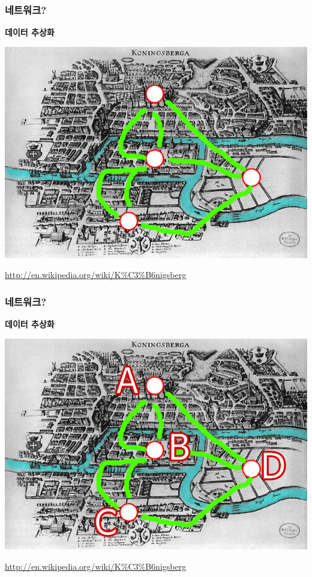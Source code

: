\documentclass{beamer}
\begin{document}
\begin{frame}
\frametitle{네트워크?}
\textbf{데이터 추상화}\\
\begin{center}
\includegraphics[scale=0.35]{Koenigsberg_edge.jpg}
\end{center}
\hfill
\tiny
\href{http://en.wikipedia.org/wiki/K\%C3\%B6nigsberg}{http://en.wikipedia.org/wiki/K\%C3\%B6nigsberg}
\end{frame}

\begin{frame}
\frametitle{네트워크?}
\textbf{데이터 추상화}\\
\begin{center}
\includegraphics[scale=0.35]{Koenigsberg_symbol.jpg}
\end{center}
\hfill
\tiny
\href{http://en.wikipedia.org/wiki/K\%C3\%B6nigsberg}{http://en.wikipedia.org/wiki/K\%C3\%B6nigsberg}
\end{frame}
\end{document}
